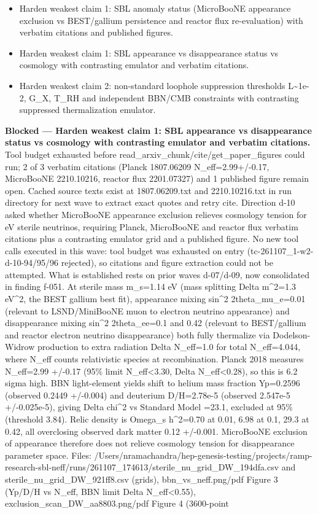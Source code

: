 \documentclass[11pt,a4paper]{article}
\begin{document}
\begin{itemize}
  \item Harden weakest claim 1: SBL anomaly status (MicroBooNE appearance exclusion vs BEST/gallium persistence and reactor flux re-evaluation) with verbatim citations and published figures.
  \item Harden weakest claim 1: SBL appearance vs disappearance status vs cosmology with contrasting emulator and verbatim citations.
  \item Harden weakest claim 2: non-standard loophole suppression thresholds L\textasciitilde{}1e-2, G\_X, T\_RH and independent BBN/CMB constraints with contrasting suppressed thermalization emulator.
\end{itemize}
\textbf{Blocked --- Harden weakest claim 1: SBL appearance vs disappearance status vs cosmology with contrasting emulator and verbatim citations.} Tool budget exhausted before read\_arxiv\_chunk/cite/get\_paper\_figures could run; 2 of 3 verbatim citations (Planck 1807.06209 N\_eff=2.99+/-0.17, MicroBooNE 2210.10216, reactor flux 2201.07327) and 1 published figure remain open. Cached source texts exist at 1807.06209.txt and 2210.10216.txt in run directory for next wave to extract exact quotes and retry cite. Direction d-10 asked whether MicroBooNE appearance exclusion relieves cosmology tension for eV sterile neutrinos, requiring Planck, MicroBooNE and reactor flux verbatim citations plus a contrasting emulator grid and a published figure. No new tool calls executed in this wave: tool budget was exhausted on entry (tc-261107\_1-w2-d-10-94/95/96 rejected), so citations and figure extraction could not be attempted. What is established rests on prior waves d-07/d-09, now consolidated in finding f-051. At sterile mass m\_s=1.14 eV (mass splitting Delta m\textasciicircum{}2=1.3 eV\textasciicircum{}2, the BEST gallium best fit), appearance mixing sin\textasciicircum{}2 2theta\_mu\_e=0.01 (relevant to LSND/MiniBooNE muon to electron neutrino appearance) and disappearance mixing sin\textasciicircum{}2 2theta\_ee=0.1 and 0.42 (relevant to BEST/gallium and reactor electron neutrino disappearance) both fully thermalize via Dodelson-Widrow production to extra radiation Delta N\_eff=1.0 for total N\_eff=4.044, where N\_eff counts relativistic species at recombination. Planck 2018 measures N\_eff=2.99 +/-0.17 (95\% limit N\_eff\textless{}3.30, Delta N\_eff\textless{}0.28), so this is 6.2 sigma high. BBN light-element yields shift to helium mass fraction Yp=0.2596 (observed 0.2449 +/-0.004) and deuterium D/H=2.78e-5 (observed 2.547e-5 +/-0.025e-5), giving Delta chi\textasciicircum{}2 vs Standard Model =23.1, excluded at 95\% (threshold 3.84). Relic density is Omega\_s h\textasciicircum{}2=0.70 at 0.01, 6.98 at 0.1, 29.3 at 0.42, all overclosing observed dark matter 0.12 +/-0.001. MicroBooNE exclusion of appearance therefore does not relieve cosmology tension for disappearance parameter space. Files: /Users/nramachandra/hep-genesis-testing/projects/ramp-research-sbl-neff/runs/261107\_174613/sterile\_nu\_grid\_DW\_194dfa.csv and sterile\_nu\_grid\_DW\_921ff8.csv (grids), bbn\_vs\_neff.png/pdf Figure 3 (Yp/D/H vs N\_eff, BBN limit Delta N\_eff\textless{}0.55), exclusion\_scan\_DW\_aa8803.png/pdf Figure 4 (3600-point 
\end{document}

